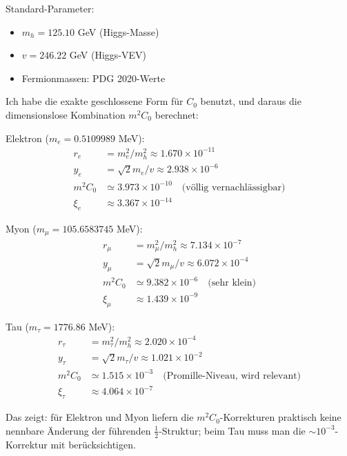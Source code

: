	\begin{numerisch}
		Standard-Parameter:
		\begin{itemize}
			\item $m_h = 125.10$ GeV (Higgs-Masse)
			\item $v = 246.22$ GeV (Higgs-VEV)
			\item Fermionmassen: PDG 2020-Werte
		\end{itemize}
		
		Ich habe die exakte geschlossene Form für $C_0$ benutzt, und daraus die dimensionslose Kombination $m^2C_0$ berechnet:
		
		Elektron ($m_e = 0.5109989$ MeV):
		\begin{align}
			r_e &= m_e^2/m_h^2 \approx 1.670 \times 10^{-11}\\
			y_e &= \sqrt{2} m_e/v \approx 2.938 \times 10^{-6}\\
			m^2C_0 &\simeq 3.973 \times 10^{-10} \quad \text{(völlig vernachlässigbar)}\\
			\xi_e &\approx 3.367 \times 10^{-14}
		\end{align}
		
		Myon ($m_\mu = 105.6583745$ MeV):
		\begin{align}
			r_\mu &= m_\mu^2/m_h^2 \approx 7.134 \times 10^{-7}\\
			y_\mu &= \sqrt{2} m_\mu/v \approx 6.072 \times 10^{-4}\\
			m^2C_0 &\simeq 9.382 \times 10^{-6} \quad \text{(sehr klein)}\\
			\xi_\mu &\approx 1.439 \times 10^{-9}
		\end{align}
		
		Tau ($m_\tau = 1776.86$ MeV):
		\begin{align}
			r_\tau &= m_\tau^2/m_h^2 \approx 2.020 \times 10^{-4}\\
			y_\tau &= \sqrt{2} m_\tau/v \approx 1.021 \times 10^{-2}\\
			m^2C_0 &\simeq 1.515 \times 10^{-3} \quad \text{(Promille-Niveau, wird relevant)}\\
			\xi_\tau &\approx 4.064 \times 10^{-7}
		\end{align}
		
		Das zeigt: für Elektron und Myon liefern die $m^2C_0$-Korrekturen praktisch keine nennbare Änderung der führenden $\frac{1}{2}$-Struktur; beim Tau muss man die $\sim 10^{-3}$-Korrektur mit berücksichtigen.
	\end{numerisch}
